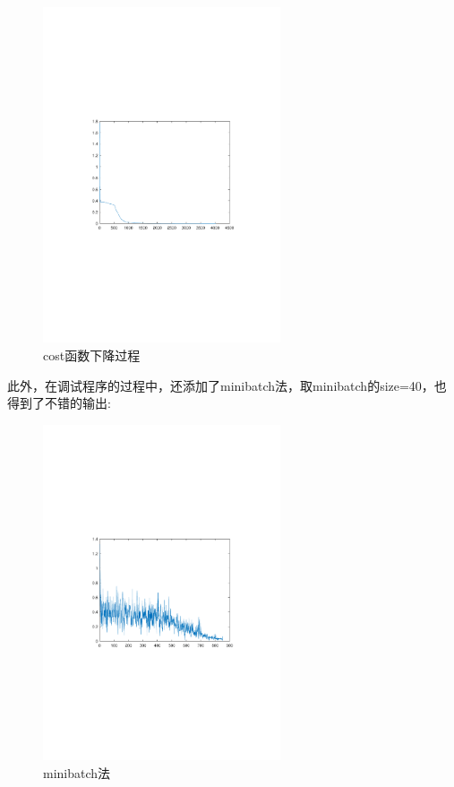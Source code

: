 \begin{figure}[H]
\centering
\includegraphics[width=7cm]{fig/symmetry1.pdf}
\caption{cost函数下降过程}
\end{figure}

此外，在调试程序的过程中，还添加了minibatch法，取minibatch的size=40，也得到了不错的输出:
\begin{figure}[H]
\centering
\includegraphics[width=7cm]{fig/symmetry2.pdf}
\caption{minibatch法}
\end{figure}